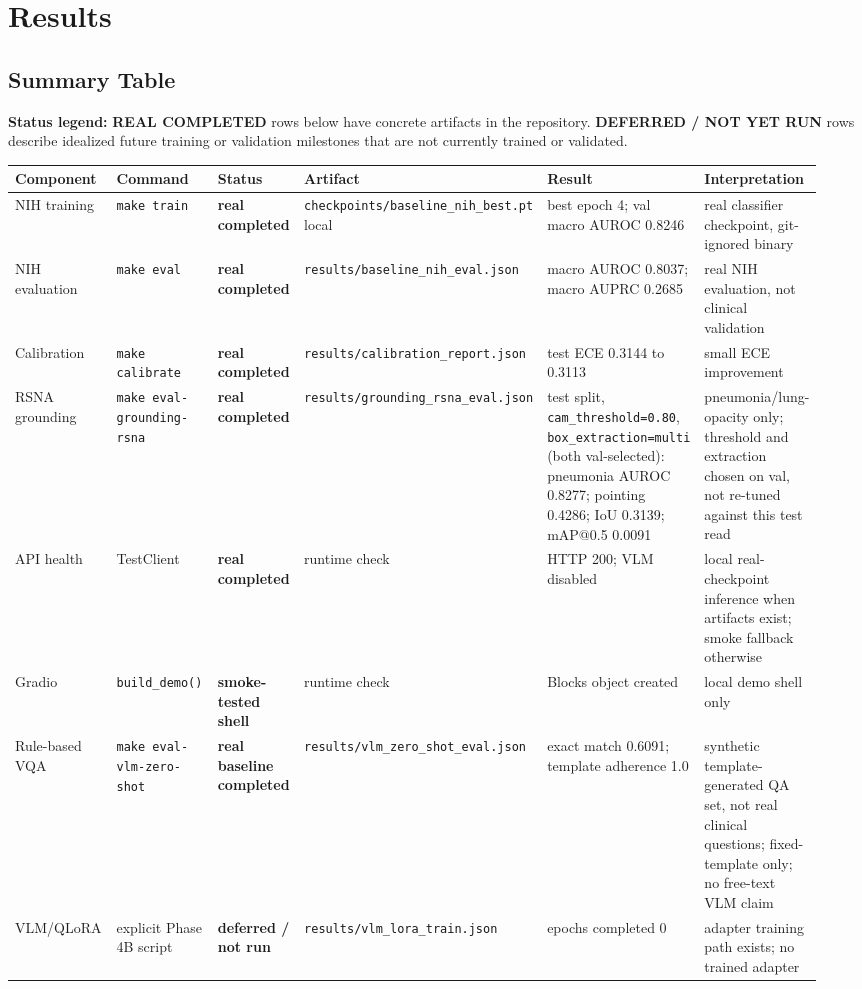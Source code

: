 \section{Results}
\label{sec:results}

\subsection{Summary Table}

\noindent\textbf{Status legend:} \textbf{REAL COMPLETED} rows below have concrete artifacts in the repository. \textbf{DEFERRED / NOT YET RUN} rows describe idealized future training or validation milestones that are not currently trained or validated.

\begin{longtable}{p{0.16\linewidth} p{0.17\linewidth} p{0.12\linewidth} p{0.19\linewidth} p{0.18\linewidth} p{0.12\linewidth}}
\toprule
Component & Command & Status & Artifact & Result & Interpretation \\
\midrule
\endhead
NIH training & \texttt{make train} & \textbf{real completed} & \texttt{checkpoints/baseline\_nih\_best.pt} local & best epoch 4; val macro AUROC 0.8246 & real classifier checkpoint, git-ignored binary \\
NIH evaluation & \texttt{make eval} & \textbf{real completed} & \texttt{results/baseline\_nih\_eval.json} & macro AUROC 0.8037; macro AUPRC 0.2685 & real NIH evaluation, not clinical validation \\
Calibration & \texttt{make calibrate} & \textbf{real completed} & \texttt{results/calibration\_report.json} & test ECE 0.3144 to 0.3113 & small ECE improvement \\
RSNA grounding & \texttt{make eval-grounding-rsna} & \textbf{real completed} & \texttt{results/grounding\_rsna\_eval.json} & test split, \texttt{cam\_threshold=0.80}, \texttt{box\_extraction=multi} (both val-selected): pneumonia AUROC 0.8277; pointing 0.4286; IoU 0.3139; mAP@0.5 0.0091 & pneumonia/lung-opacity only; threshold and extraction chosen on val, not re-tuned against this test read \\
API health & TestClient & \textbf{real completed} & runtime check & HTTP 200; VLM disabled & local real-checkpoint inference when artifacts exist; smoke fallback otherwise \\
Gradio & \texttt{build\_demo()} & \textbf{smoke-tested shell} & runtime check & Blocks object created & local demo shell only \\
Rule-based VQA & \texttt{make eval-vlm-zero-shot} & \textbf{real baseline completed} & \texttt{results/vlm\_zero\_shot\_eval.json} & exact match 0.6091; template adherence 1.0 & synthetic template-generated QA set, not real clinical questions; fixed-template only; no free-text VLM claim \\
VLM/QLoRA & explicit Phase 4B script & \textbf{deferred / not run} & \texttt{results/vlm\_lora\_train.json} & epochs completed 0 & adapter training path exists; no trained adapter \\
\bottomrule
\end{longtable}

